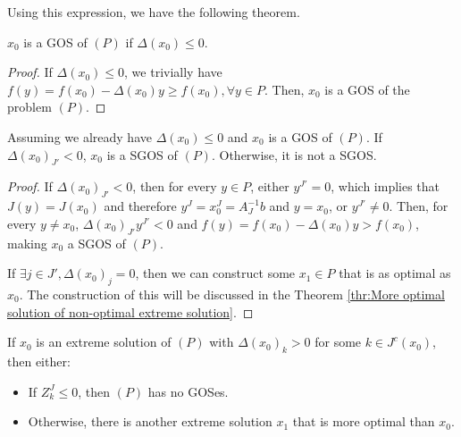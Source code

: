 Using this expression, we have the following theorem.

\begin{theorem}
\label{thr:Optimal condition of extreme solution}
  \( x_{0} \) is a GOS of \( (P) \) if \( \Delta(x_{0}) \le 0 \).
\end{theorem}

\begin{proof}
  If \( \Delta(x_{0}) \le 0 \), we trivially have \( f(y) = f(x_{0}) -
  \Delta(x_{0}) y \ge
  f(x_{0}), \forall  y\in P \). Then, \( x_{0} \) is a GOS of the problem \( (P)
  \).
\end{proof}

\begin{corollary}
\label{cor:Strictly negative case of optimal condition}
  Assuming we already have \( \Delta(x_{0}) \le 0 \) and \( x_{0} \) is a GOS of \( (P)
  \).
  If \( \Delta(x_{0})_{J'} < 0 \), \( x_{0} \) is a SGOS of \( (P) \). Otherwise, it is
  not a SGOS.
\end{corollary}

\begin{proof}
  If \( \Delta(x_{0})_{J'}< 0 \), then for every \( y \in P \), either \( y^{J'}
  = 0\), which implies that \( J(y) = J(x_{0}) \) and therefore \( y^{J} =
  x_{0}^{J} = A_{J}^{-1}b \) and \( y = x_{0} \), or \( y^{J'} \neq 0 \). Then,
  for every \( y \neq  x_{0} \), \( \Delta(x_{0})_{J'} y^{J'} < 0 \) and \( f(y) =
  f(x_{0}) - \Delta(x_{0}) y > f(x_{0}) \), making \( x_{0} \) a SGOS of \( (P) \).

  If \( \exists  j \in J', \Delta(x_{0})_{j} = 0 \), then we can construct some \(
  x_{1} \in P \) that is as optimal as \( x_{0} \). The
  construction of this will be discussed in the Theorem \ref{thr:More optimal
  solution of non-optimal extreme solution}.
\end{proof}

\begin{theorem}
\label{thr:More optimal solution of non-optimal extreme solution}
If \( x_{0} \) is an extreme solution of \( (P) \) with \( \Delta(x_{0})_{k} > 0
\) for some \( k \in J^{c}(x_{0}) \), then either:
\begin{itemize}
\item If \( Z^{J}_{k} \le 0  \), then \( (P) \) has no GOSes.
\item Otherwise, there is another extreme solution \( x_{1} \) that is more
  optimal than \( x_{0} \).
\end{itemize}
\end{theorem}

